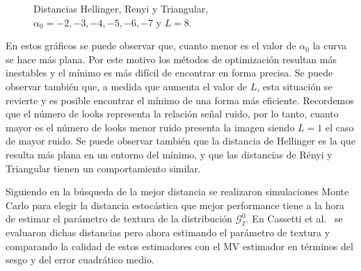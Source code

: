 \begin{figure}[h!]
	\centering    
	\caption{\label{DistL8}\small Distancias Hellinger, Renyi y Triangular, $\alpha_0= -2,-3,-4,-5,-6,-7$ y $L=8$.}
\end{figure}

En estos gráficos se puede observar que, cuanto menor es el valor de $\alpha_0$ la curva se hace más plana. Por este motivo los métodos de optimización resultan más inestables y el mínimo es más difícil de encontrar en forma precisa. Se puede observar también que, a medida que aumenta el valor de $L$, esta situación se revierte y es posible encontrar el mínimo de una forma más eficiente. Recordemos que el número de looks representa la relación señal ruido, por lo tanto, cuanto mayor es el número de looks menor ruido presenta la imagen siendo $L=1$ el caso de mayor ruido. Se puede observar también que la distancia de Hellinger es la que resulta más plana en un entorno del mínimo, y que las distancias de Rényi y Triangular tienen un comportamiento similar.

Siguiendo en la búsqueda de la mejor distancia se realizaron simulaciones Monte Carlo para elegir la distancia estocástica que mejor performance tiene a la hora de estimar el parámetro de textura de la distribución $\mathcal{G}_I^0$. En Cassetti et al.~\cite{cassettiast2013} se evaluaron dichas distancias pero ahora estimando el parámetro de textura y  comparando la calidad de estos estimadores con el MV estimador en términos del sesgo y del error cuadrático medio. 

